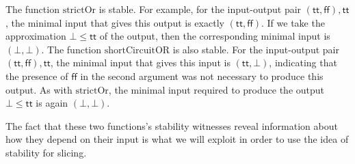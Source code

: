 \begin{example}
  The function $\mathrm{strictOr}$ is stable. For example, for the
  input-output pair $(\mathsf{tt},\mathsf{ff}), \mathsf{tt}$, the
  minimal input that gives this output is exactly
  $(\mathsf{tt}, \mathsf{ff})$. If we take the approximation
  $\bot \leq \mathsf{tt}$ of the output, then the corresponding
  minimal input is $(\bot, \bot)$. The function
  $\mathrm{shortCircuitOR}$ is also stable. For the input-output pair
  $(\mathsf{tt},\mathsf{ff}),\mathsf{tt}$, the minimal input that
  gives this input is $(\mathsf{tt},\bot)$, indicating that the
  presence of $\mathsf{ff}$ in the second argument was not necessary
  to produce this output. As with $\mathrm{strictOr}$, the minimal
  input required to produce the output $\bot \leq \mathsf{tt}$ is
  again $(\bot,\bot)$.

  The fact that these two functions's stability witnesses reveal
  information about how they depend on their input is what we will
  exploit in order to use the idea of stability for slicing.
\end{example}

